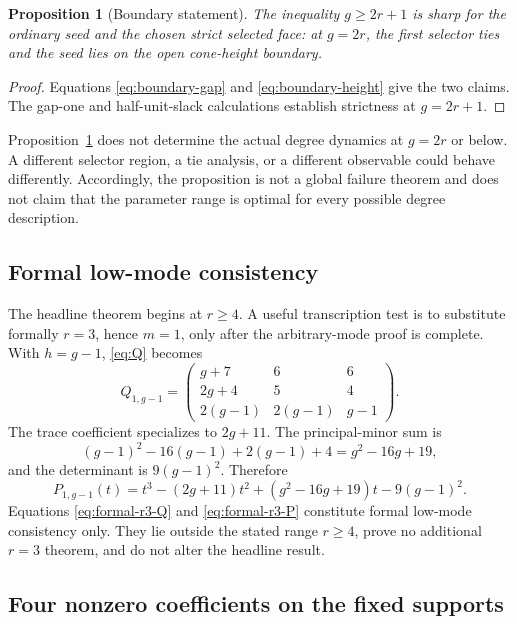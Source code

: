 \documentclass[11pt]{article}
\newtheorem{proposition}[theorem]{Proposition}
\theoremstyle{remark}
\numberwithin{equation}{section}
\begin{document}
\begin{proposition}[Boundary statement]\label{prop:boundary}
The inequality \(g\geq2r+1\) is sharp for the ordinary seed and the chosen
strict selected face: at \(g=2r\), the first selector ties and the seed lies
on the open cone-height boundary.
\end{proposition}

\begin{proof}
Equations \eqref{eq:boundary-gap} and \eqref{eq:boundary-height} give the two
claims.  The gap-one and half-unit-slack calculations establish strictness at
\(g=2r+1\).
\end{proof}

Proposition~\ref{prop:boundary} does not determine the actual degree dynamics
at \(g=2r\) or below.  A different selector region, a tie analysis, or a
different observable could behave differently.  Accordingly, the proposition
is not a global failure theorem and does not claim that the parameter range
is optimal for every possible degree description.

\subsection{Formal low-mode consistency}

The headline theorem begins at \(r\geq4\).  A useful transcription test is
to substitute formally \(r=3\), hence \(m=1\), only after the arbitrary-mode
proof is complete.  With \(h=g-1\), \eqref{eq:Q} becomes
\begin{equation}\label{eq:formal-r3-Q}
Q_{1,g-1}=
\begin{pmatrix}
g+7&6&6\\
2g+4&5&4\\
2(g-1)&2(g-1)&g-1
\end{pmatrix}.
\end{equation}
The trace coefficient specializes to \(2g+11\).  The principal-minor sum is
\[
(g-1)^2-16(g-1)+2(g-1)+4
=g^2-16g+19,
\]
and the determinant is \(9(g-1)^2\).  Therefore
\begin{equation}\label{eq:formal-r3-P}
P_{1,g-1}(t)
=t^3-(2g+11)t^2+(g^2-16g+19)t-9(g-1)^2.
\end{equation}
Equations \eqref{eq:formal-r3-Q} and \eqref{eq:formal-r3-P} constitute
formal low-mode consistency only.  They lie outside the stated range
\(r\geq4\), prove no additional \(r=3\) theorem, and do not alter the
headline result.

\subsection{Four nonzero coefficients on the fixed supports}
\end{document}
